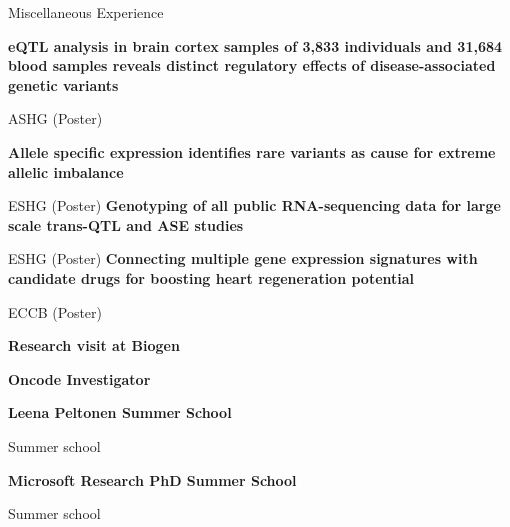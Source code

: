 \begin{rubric}{Miscellaneous Experience}



\entry*[17 October 2019] \textbf{eQTL analysis in brain cortex samples of 3,833 individuals and 31,684 blood samples reveals distinct regulatory effects of disease-associated genetic variants} \par
ASHG (Poster)

\entry*[17 June 2018] \textbf{Allele specific expression identifies rare variants as cause for extreme allelic imbalance} \par
ESHG (Poster)
%
\entry*[25 May 2016] \textbf{Genotyping of all public RNA-sequencing data for large scale trans-QTL and ASE studies} \par
ESHG (Poster)
%
\entry*[8 Sep 2014] \textbf{Connecting multiple gene expression signatures with candidate drugs for boosting heart regeneration potential} \par
ECCB (Poster)


 \textbf{Research visit at Biogen} \par

\entry*[Sep 2019 -- ] \textbf{Oncode Investigator} \par


\entry*[Aug 2018] \textbf{Leena Peltonen Summer School} \par
Summer school

\entry*[Jul 2016] \textbf{Microsoft Research PhD Summer School} \par
Summer school

\end{rubric}